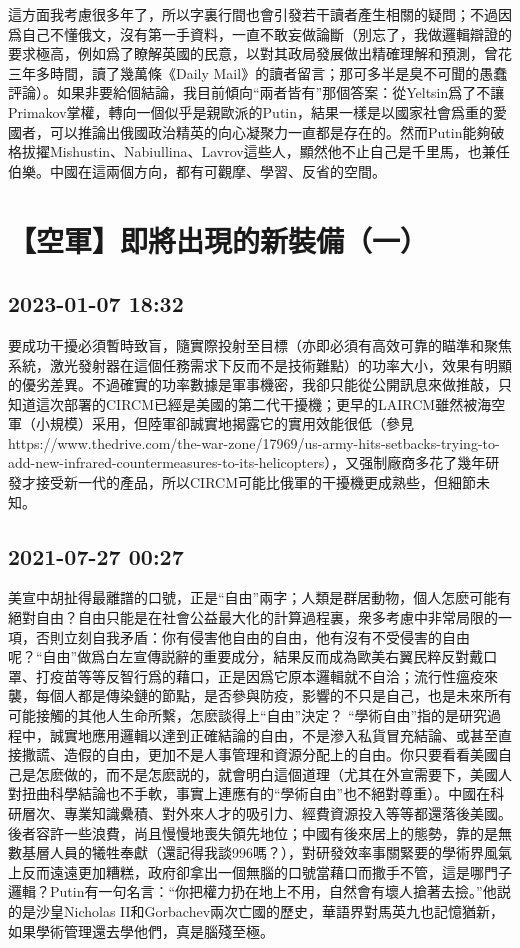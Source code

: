 \documentclass[twocolumn]{ctexart}
\begin{document}
這方面我考慮很多年了，所以字裏行間也會引發若干讀者產生相關的疑問；不過因爲自己不懂俄文，沒有第一手資料，一直不敢妄做論斷（別忘了，我做邏輯辯證的要求極高，例如爲了瞭解英國的民意，以對其政局發展做出精確理解和預測，曾花三年多時間，讀了幾萬條《Daily Mail》的讀者留言；那可多半是臭不可聞的愚蠢評論）。如果非要給個結論，我目前傾向“兩者皆有”那個答案：從Yeltsin爲了不讓Primakov掌權，轉向一個似乎是親歐派的Putin，結果一樣是以國家社會爲重的愛國者，可以推論出俄國政治精英的向心凝聚力一直都是存在的。然而Putin能夠破格拔擢Mishustin、Nabiullina、Lavrov這些人，顯然他不止自己是千里馬，也兼任伯樂。中國在這兩個方向，都有可觀摩、學習、反省的空間。
\section*{【空軍】即將出現的新裝備（一）}
\subsection*{2023-01-07 18:32}

要成功干擾必須暫時致盲，隨實際投射至目標（亦即必須有高效可靠的瞄準和聚焦系統，激光發射器在這個任務需求下反而不是技術難點）的功率大小，效果有明顯的優劣差異。不過確實的功率數據是軍事機密，我卻只能從公開訊息來做推敲，只知道這次部署的CIRCM已經是美國的第二代干擾機；更早的LAIRCM雖然被海空軍（小規模）采用，但陸軍卻誠實地揭露它的實用效能很低（參見https://www.thedrive.com/the-war-zone/17969/us-army-hits-setbacks-trying-to-add-new-infrared-countermeasures-to-its-helicopters），又强制廠商多花了幾年研發才接受新一代的產品，所以CIRCM可能比俄軍的干擾機更成熟些，但細節未知。
\subsection*{2021-07-27 00:27}

美宣中胡扯得最離譜的口號，正是“自由”兩字；人類是群居動物，個人怎麽可能有絕對自由？自由只能是在社會公益最大化的計算過程裏，衆多考慮中非常局限的一項，否則立刻自我矛盾：你有侵害他自由的自由，他有沒有不受侵害的自由呢？“自由”做爲白左宣傳説辭的重要成分，結果反而成為歐美右翼民粹反對戴口罩、打疫苗等等反智行爲的藉口，正是因爲它原本邏輯就不自洽；流行性瘟疫來襲，每個人都是傳染鏈的節點，是否參與防疫，影響的不只是自己，也是未來所有可能接觸的其他人生命所繫，怎麽談得上“自由”決定？
“學術自由”指的是研究過程中，誠實地應用邏輯以達到正確結論的自由，不是滲入私貨冒充結論、或甚至直接撒謊、造假的自由，更加不是人事管理和資源分配上的自由。你只要看看美國自己是怎麽做的，而不是怎麽説的，就會明白這個道理（尤其在外宣需要下，美國人對扭曲科學結論也不手軟，事實上連應有的“學術自由”也不絕對尊重）。中國在科研層次、專業知識纍積、對外來人才的吸引力、經費資源投入等等都還落後美國。後者容許一些浪費，尚且慢慢地喪失領先地位；中國有後來居上的態勢，靠的是無數基層人員的犧牲奉獻（還記得我談996嗎？），對研發效率事關緊要的學術界風氣上反而遠遠更加糟糕，政府卻拿出一個無腦的口號當藉口而撒手不管，這是哪門子邏輯？Putin有一句名言：“你把權力扔在地上不用，自然會有壞人搶著去撿。”他説的是沙皇Nicholas II和Gorbachev兩次亡國的歷史，華語界對馬英九也記憶猶新，如果學術管理還去學他們，真是腦殘至極。
\end{document}
